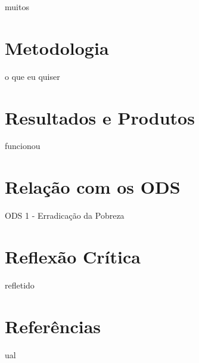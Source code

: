 \documentclass[12pt,a4paper]{article}
\begin{document}
muitos


\section*{Metodologia}

o que eu quiser


\section*{Resultados e Produtos}

funcionou


\section*{Relação com os ODS}

ODS 1 - Erradicação da Pobreza


\section*{Reflexão Crítica }

refletido


\section*{Referências}

ual
\end{document}
